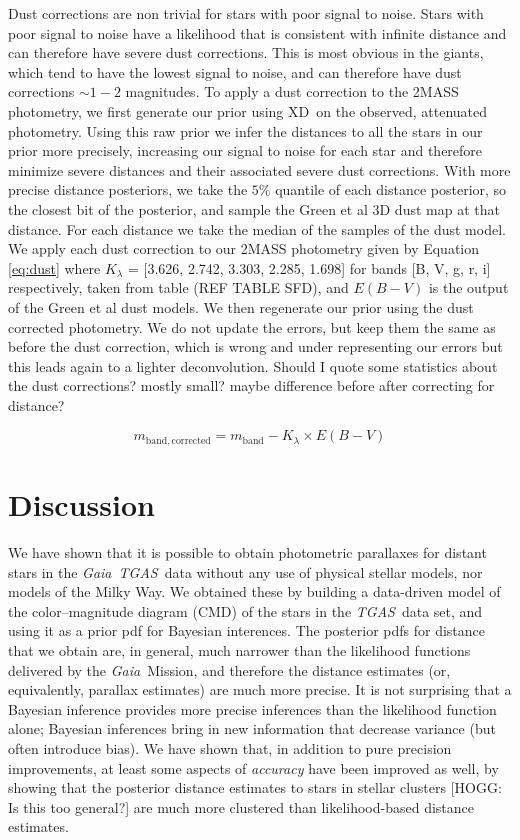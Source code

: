 \documentclass[12pt, preprint]{aastex6}
\newcommand{\acronym}[1]{{\small{#1}}}
\newcommand{\project}[1]{\textsl{#1}}
\newcommand{\tgas}{\project{\acronym{TGAS}}}
\newcommand{\gaia}{\project{Gaia}}
\newcommand{\xd}{\acronym{XD}}
\newcommand{\cmd}{\acronym{CMD}}
\begin{document}
Dust corrections are non trivial for stars with poor signal to noise. Stars with poor signal to noise have a likelihood that is consistent with infinite distance and can therefore have severe dust corrections. This is most obvious in the giants, which tend to have the lowest signal to noise, and can therefore have dust corrections $\sim 1-2$ magnitudes. To apply a dust correction to the 2MASS photometry, we first generate our prior using \xd\ on the observed, attenuated photometry. Using this raw prior we infer the distances to all the stars in our prior more precisely, increasing our signal to noise for each star and therefore minimize severe distances and their associated severe dust corrections. With more precise distance posteriors, we take the $5\%$ quantile of each distance posterior, so the closest bit of the posterior, and sample the Green et al 3D dust map at that distance. For each distance we take the median of the samples of the dust model. We apply each dust correction to our 2MASS photometry given by Equation \ref{eq:dust} where $K_{\lambda}$ = [3.626, 2.742, 3.303, 2.285, 1.698] for bands [B, V, g, r, i] respectively, taken from table (REF TABLE SFD), and $E(B-V)$ is the output of the Green et al dust models. We then regenerate our prior using the dust corrected photometry. We do not update the errors, but keep them the same as before the dust correction, which is wrong and under representing our errors but this leads again to a lighter deconvolution. Should I quote some statistics about the dust corrections? mostly small? maybe difference before after correcting for distance?

\begin{equation}
\label{eq:dust}
m_{\mathrm{band, corrected}} = m_{\mathrm{band}} - K_{\lambda} \times E(B-V)
\end{equation}

\section{Discussion}

We have shown that it is possible to obtain photometric parallaxes for
distant stars in the \gaia\ \tgas\ data without any use of physical stellar
models, nor models of the Milky Way.
We obtained these by building a data-driven model of the
color--magnitude diagram (\cmd) of the stars in the \tgas\ data set,
and using it as a prior pdf for Bayesian interences.
The posterior pdfs for distance that we obtain are, in general, much
narrower than the likelihood functions delivered by the
\gaia\ Mission, and therefore the distance estimates (or,
equivalently, parallax estimates) are much more precise.
It is not surprising that a Bayesian inference provides more
precise inferences than the likelihood function alone; Bayesian
inferences bring in new information that decrease variance (but
often introduce bias).
We have shown that, in addition to pure precision improvements, at
least some aspects of \emph{accuracy} have been improved as well, by
showing that the posterior distance estimates to stars in stellar
clusters [HOGG: Is this too general?] are much more clustered than likelihood-based distance
estimates.
\end{document}
